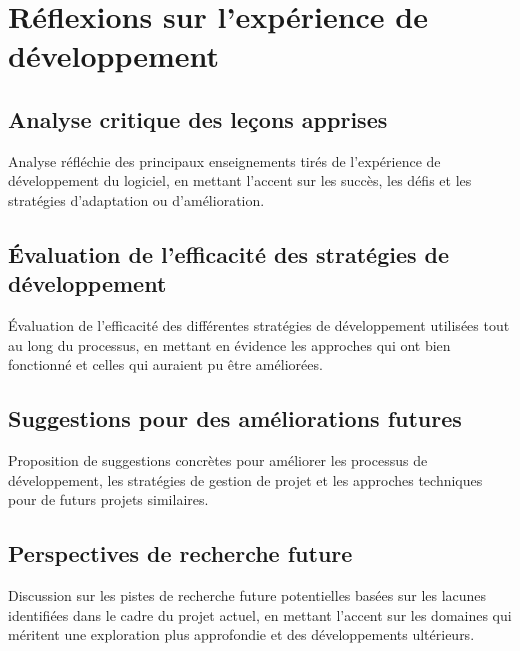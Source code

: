 \section{Réflexions sur l'expérience de développement}
\subsection{Analyse critique des leçons apprises}
Analyse réfléchie des principaux enseignements tirés de l'expérience de développement du logiciel, en mettant l'accent sur les succès, les défis et les stratégies d'adaptation ou d'amélioration.

\subsection{Évaluation de l'efficacité des stratégies de développement}
Évaluation de l'efficacité des différentes stratégies de développement utilisées tout au long du processus, en mettant en évidence les approches qui ont bien fonctionné et celles qui auraient pu être améliorées.

\subsection{Suggestions pour des améliorations futures}
Proposition de suggestions concrètes pour améliorer les processus de développement, les stratégies de gestion de projet et les approches techniques pour de futurs projets similaires.

\subsection{Perspectives de recherche future}
Discussion sur les pistes de recherche future potentielles basées sur les lacunes identifiées dans le cadre du projet actuel, en mettant l'accent sur les domaines qui méritent une exploration plus approfondie et des développements ultérieurs.